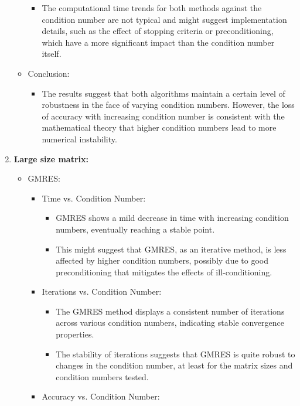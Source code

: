 \begin{enumerate}
\begin{itemize}
\begin{itemize}
           \item The computational time trends for both methods against the condition number are not typical and might suggest implementation details, such as the effect of stopping criteria or preconditioning, which have a more significant impact than the condition number itself.
        \end{itemize}
        \item Conclusion:
        \begin{itemize}
            \item The results suggest that both algorithms maintain a certain level of robustness in the face of varying condition numbers. However, the loss of accuracy with increasing condition number is consistent with the mathematical theory that higher condition numbers lead to more numerical instability.
        \end{itemize}
    \end{itemize}
    \item \textbf{Large size matrix:}
    \begin{itemize}
        \item GMRES:
        \begin{itemize}
            \item Time vs. Condition Number:
            \begin{itemize}
                \item GMRES shows a mild decrease in time with increasing condition numbers, eventually reaching a stable point.
                \item This might suggest that GMRES, as an iterative method, is less affected by higher condition numbers, possibly due to good preconditioning that mitigates the effects of ill-conditioning.
            \end{itemize}
            \item Iterations vs. Condition Number:
            \begin{itemize}
                \item The GMRES method displays a consistent number of iterations across various condition numbers, indicating stable convergence properties.
                \item The stability of iterations suggests that GMRES is quite robust to changes in the condition number, at least for the matrix sizes and condition numbers tested.
            \end{itemize}
            \item Accuracy vs. Condition Number:

\end{itemize}
\end{itemize}
\end{enumerate}
